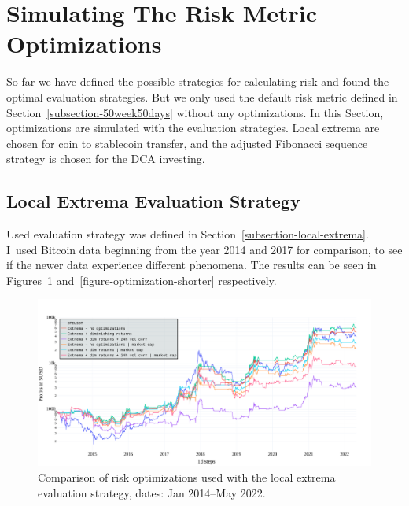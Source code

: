 \section{Simulating The Risk Metric Optimizations}
\label{section-sim-optimizations}
So far we have defined the possible strategies for calculating risk and found the optimal evaluation strategies. But we only used the default risk metric defined in Section~\ref{subsection-50week50days} without any optimizations. In this Section, optimizations are simulated with the evaluation strategies. Local extrema are chosen for coin to stablecoin transfer, and the adjusted Fibonacci sequence strategy is chosen for the DCA investing.

\subsection*{Local Extrema Evaluation Strategy}
Used evaluation strategy was defined in Section~\ref{subsection-local-extrema}. I~used Bitcoin data beginning from the year 2014 and 2017 for comparison, to see if the newer data experience different phenomena. The results can be seen in Figures~\ref{figure-optimization-longer} and~\ref{figure-optimization-shorter} respectively.

\begin{figure}[!t]
    \centering
    \includegraphics[width=\columnwidth]{figures/evaluation-optimization-longer.pdf}
    \caption{Comparison of risk optimizations used with the local extrema evaluation strategy, dates: Jan 2014--May 2022.}
    \label{figure-optimization-longer}
\end{figure}


